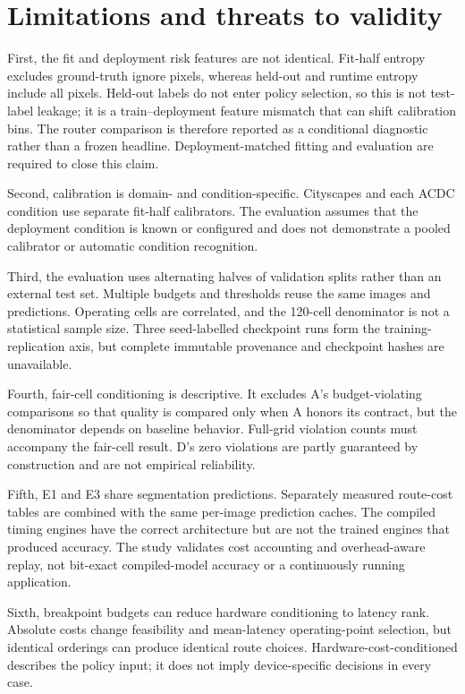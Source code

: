 \documentclass[a4paper,review,12pt]{elsarticle}
\begin{document}
\section{Limitations and threats to validity}
\label{sec:limitations}

First, the fit and deployment risk features are not identical. Fit-half entropy excludes ground-truth ignore pixels, whereas held-out and runtime entropy include all pixels. Held-out labels do not enter policy selection, so this is not test-label leakage; it is a train--deployment feature mismatch that can shift calibration bins. The router comparison is therefore reported as a conditional diagnostic rather than a frozen headline. Deployment-matched fitting and evaluation are required to close this claim.

Second, calibration is domain- and condition-specific. Cityscapes and each ACDC condition use separate fit-half calibrators. The evaluation assumes that the deployment condition is known or configured and does not demonstrate a pooled calibrator or automatic condition recognition.

Third, the evaluation uses alternating halves of validation splits rather than an external test set. Multiple budgets and thresholds reuse the same images and predictions. Operating cells are correlated, and the 120-cell denominator is not a statistical sample size. Three seed-labelled checkpoint runs form the training-replication axis, but complete immutable provenance and checkpoint hashes are unavailable.

Fourth, fair-cell conditioning is descriptive. It excludes A's budget-violating comparisons so that quality is compared only when A honors its contract, but the denominator depends on baseline behavior. Full-grid violation counts must accompany the fair-cell result. D's zero violations are partly guaranteed by construction and are not empirical reliability.

Fifth, E1 and E3 share segmentation predictions. Separately measured route-cost tables are combined with the same per-image prediction caches. The compiled timing engines have the correct architecture but are not the trained engines that produced accuracy. The study validates cost accounting and overhead-aware replay, not bit-exact compiled-model accuracy or a continuously running application.

Sixth, breakpoint budgets can reduce hardware conditioning to latency rank. Absolute costs change feasibility and mean-latency operating-point selection, but identical orderings can produce identical route choices. Hardware-cost-conditioned describes the policy input; it does not imply device-specific decisions in every case.
\end{document}
